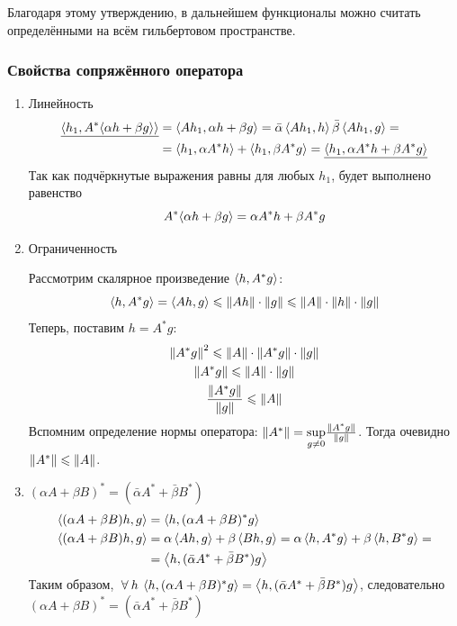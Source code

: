 \documentclass[12pt]{article}
\begin{document}
	Благодаря этому утверждению, в дальнейшем функционалы можно считать определёнными на всём гильбертовом пространстве.
	
	\subsubsection{Свойства сопряжённого оператора}
	
	\begin{enumerate}
		\item Линейность
		\begin{align*}
			\underline{ \left\langle h_1, A^{*}\langle \alpha h + \beta g \rangle \right\rangle } &= \left\langle Ah_1, \alpha h + \beta g \right\rangle = 
			\bar{\alpha}\left\langle Ah_1, h \right\rangle \bar{\beta}\left\langle Ah_1, g \right\rangle = \\
			&= \left\langle h_1, \alpha A^{*} h \right\rangle + \left\langle h_1, \beta A^{*} g \right\rangle = 
			\underline{ \left\langle h_1, \alpha A^{*} h + \beta A^{*} g \right\rangle }
		\end{align*}
		Так как подчёркнутые выражения равны для любых $h_1$, будет выполнено равенство
		$$A^{*}\langle \alpha h + \beta g \rangle = \alpha A^{*} h + \beta A^{*} g$$
		
		\item Ограниченность \label{bounded}
		
		Рассмотрим скалярное произведение $\left\langle h, A^{*}g \right\rangle$: 
		$$\left\langle h, A^{*}g \right\rangle = \left\langle Ah, g \right\rangle \leqslant \left\| Ah \right\|\cdot\left\| g \right\| \leqslant \left\| A \right\|\cdot\left\| h \right\|\cdot\left\| g \right\|$$
		Теперь, поставим $h = A^{*}g$:
		\begin{gather*}
			\left\| A^{*}g \right\|^2 \leqslant \left\| A \right\|\cdot\left\| A^{*}g \right\|\cdot\left\| g \right\| \\
			\left\| A^{*}g \right\| \leqslant \left\| A \right\|\cdot\left\| g \right\| \\
			\dfrac{\left\| A^{*}g \right\|}{\left\| g \right\|} \leqslant \left\| A \right\|
		\end{gather*}
		Вспомним определение нормы оператора: $\left\| A^{*} \right\| = \underset{g \neq 0}{\sup} \frac{\left\| A^{*}g \right\|}{\left\| g \right\|}$. Тогда очевидно
		$\left\| A^{*} \right\| \leqslant \left\| A \right\|$.
		
		\item $(\alpha A + \beta B)^{*} = (\bar{\alpha}A^{*} + \bar{\beta}B^{*})$ \label{conjlin}
		\begin{align*}
			\left\langle (\alpha A + \beta B)h, g \right\rangle &= \left\langle h, (\alpha A + \beta B)^{*}g \right\rangle \\
			\left\langle (\alpha A + \beta B)h, g \right\rangle &= \alpha\left\langle Ah, g \right\rangle + \beta\left\langle Bh, g \right\rangle 
			= \alpha\left\langle h, A^{*}g \right\rangle + \beta \left\langle h, B^{*}g \right\rangle = \\
			&= \left\langle h, (\bar{\alpha}A^{*} + \bar{\beta}B^{*})g \right\rangle
		\end{align*}
		Таким образом, $\forall h\: \scal{h}{(\alpha A + \beta B)^{*}g} = \scal{h}{(\bar{\alpha}A^{*} + \bar{\beta}B^{*})g}$, 
		следовательно $(\alpha A + \beta B)^{*} = (\bar{\alpha}A^{*} + \bar{\beta}B^{*})$ \\
		

\end{enumerate}
\end{document}
